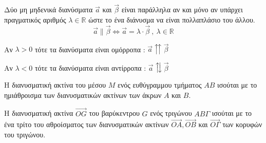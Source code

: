 \documentclass[twoside,nofonts,internet,shmeiwseis]{thewria}
\begin{document}
Δύο μη μηδενικά διανύσματα $ \vec{a} $ και $ \vec{\beta} $ είναι παράλληλα αν και μόνο αν υπάρχει πραγματικός αριθμός $ \lambda\in\mathbb{R} $ ώστε το ένα διάνυσμα να είναι πολλαπλάσιο του άλλου.
\[ \vec{a}\parallel\vec{\beta}\Leftrightarrow \vec{a}=\lambda\cdot\vec{\beta}\ ,\ \lambda\in\mathbb{R} \]
\begin{rlist}
\item Αν $ \lambda>0 $ τότε τα διανύσματα είναι ομόρροπα : $ \vec{a}\upuparrows\vec{\beta} $
\item Αν $ \lambda<0 $ τότε τα διανύσματα είναι αντίρροπα : $ \vec{a}\updownarrows\vec{\beta} $
\end{rlist}
Η διανυσματική ακτίνα του μέσου $ M $ ενός ευθύγραμμου τμήματος $ AB $ ισούται με το ημιάθροισμα των διανυσματικών ακτίνων των άκρων $ A $ και $ B $.
\begin{center}
\end{center}
Η διανυσματική ακτίνα $ \overrightarrow{OG} $ του βαρύκεντρου $ G $ ενός τριγώνου $ AB\varGamma $ ισούται με το ένα τρίτο του αθροίσματος των διανυσματικών ακτίνων $ \overrightarrow{OA},\overrightarrow{OB} $ και $ \overrightarrow{O\varGamma} $ των κορυφών του τριγώνου.
\begin{center}
\end{center}
\end{document}
